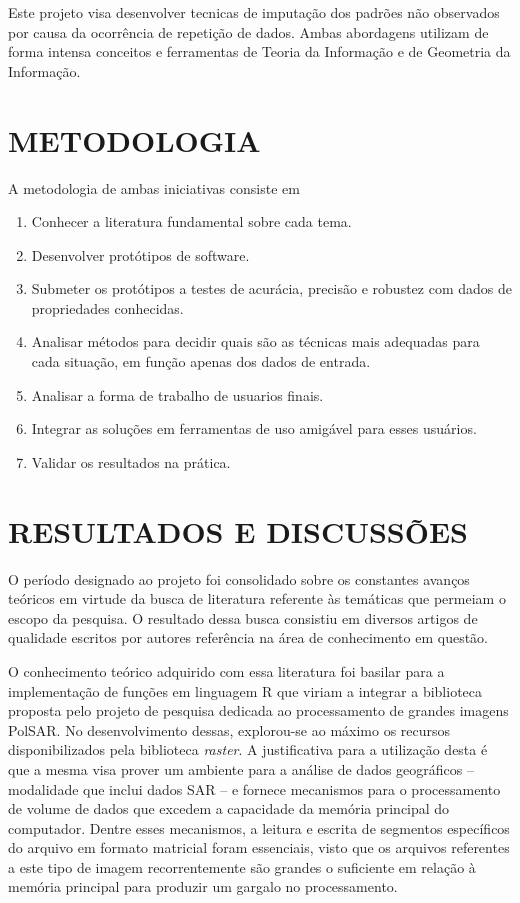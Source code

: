 \documentclass[12pt,letterpaper]{article}
\begin{document}
Este projeto visa desenvolver tecnicas de imputação dos padrões não observados por causa da ocorrência de repetição de dados. Ambas abordagens utilizam de forma intensa conceitos e ferramentas de Teoria da Informação e de Geometria da Informação.

  
\newpage
\section*{\centering \textbf{METODOLOGIA}} %
A metodologia de ambas iniciativas consiste em
\begin{enumerate}
\item Conhecer a literatura fundamental sobre cada tema.
\item Desenvolver protótipos de software.
\item Submeter os protótipos a testes de acurácia, precisão e robustez com dados de propriedades conhecidas.
\item Analisar métodos para decidir quais são as técnicas mais adequadas para cada situação, em função apenas dos dados de entrada.
\item Analisar a forma de trabalho de usuarios finais.
\item Integrar as soluções em ferramentas de uso amigável para esses usuários.
\item Validar os resultados na prática.
\end{enumerate}

  
\newpage
\section*{\centering \textbf{RESULTADOS E DISCUSSÕES}} %
O período designado ao projeto foi consolidado sobre os constantes avanços teóricos em virtude da busca de literatura referente às temáticas que permeiam o escopo da pesquisa. O resultado dessa busca consistiu em diversos artigos de qualidade escritos por autores referência na área de conhecimento em questão.

O conhecimento teórico adquirido com essa literatura foi basilar para a implementação de funções em linguagem R que viriam a integrar a biblioteca proposta pelo projeto de pesquisa dedicada ao processamento de grandes imagens PolSAR. No desenvolvimento dessas, explorou-se ao máximo os recursos disponibilizados pela biblioteca \textit{raster}. A justificativa para a utilização desta é que a mesma visa prover um ambiente para a análise de dados geográficos -- modalidade que inclui dados SAR -- e fornece mecanismos para o processamento de volume de dados que excedem a capacidade da memória principal do computador. Dentre esses mecanismos, a leitura e escrita de segmentos específicos do arquivo em formato matricial foram essenciais, visto que os arquivos referentes a este tipo de imagem recorrentemente são grandes o suficiente em relação à memória principal para produzir um gargalo no processamento.
\end{document}
